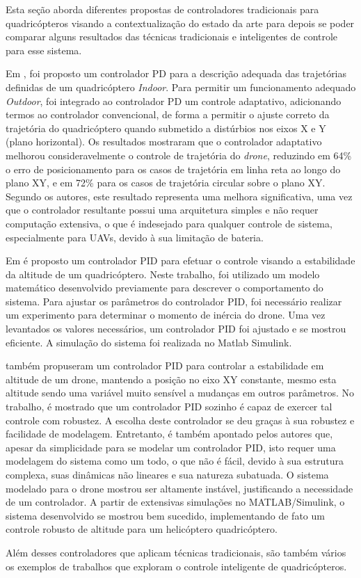 Esta seção aborda diferentes propostas de controladores tradicionais para quadricópteros visando a contextualização do estado da arte para depois se poder comparar alguns resultados das técnicas tradicionais e inteligentes de controle para esse sistema.

Em \cite{Razinkova2014}, foi proposto um controlador PD para a descrição adequada das trajetórias definidas de um quadricóptero \textit{Indoor}. Para permitir um funcionamento adequado \textit{Outdoor}, foi integrado ao controlador PD um controle adaptativo, adicionando termos ao controlador convencional, de forma a permitir o ajuste correto da trajetória do quadricóptero quando submetido a distúrbios nos eixos X e Y (plano horizontal). Os resultados mostraram que o controlador adaptativo melhorou consideravelmente o controle de trajetória do \textit{drone}, reduzindo em 64\% o erro de posicionamento para os casos de trajetória em linha reta ao longo do plano XY, e em 72\% para os casos de trajetória circular sobre o plano XY. Segundo os autores, este resultado representa uma melhora significativa, uma vez que o controlador resultante possui uma arquitetura simples e não requer computação extensiva, o que é indesejado para qualquer controle de sistema, especialmente para UAVs, devido à sua limitação de bateria.

Em \cite{Mustapa2014} é proposto um controlador PID para efetuar o controle visando a estabilidade da altitude de um quadricóptero. Neste trabalho, foi utilizado um modelo matemático desenvolvido previamente para descrever o comportamento do sistema. Para ajustar os parâmetros do controlador PID, foi necessário realizar um experimento para determinar o momento de inércia do drone. Uma vez levantados os valores necessários, um controlador PID foi ajustado e se mostrou eficiente. A simulação do sistema foi realizada no Matlab Simulink\textsuperscript{\textregistered}.

 também propuseram um controlador PID para controlar a estabilidade em altitude de um drone, mantendo a posição no eixo XY constante, mesmo esta altitude sendo uma variável muito sensível a mudanças em outros parâmetros. No trabalho, é mostrado que um controlador PID sozinho é capaz de exercer tal controle com robustez. A escolha deste controlador se deu graças à sua robustez e facilidade de modelagem. Entretanto, é também apontado pelos autores que, apesar da simplicidade para se modelar um controlador PID, isto requer uma modelagem do sistema como um todo, o que não é fácil, devido à sua estrutura complexa, suas dinâmicas não lineares e sua natureza subatuada. O sistema modelado para o drone mostrou ser altamente instável, justificando a necessidade de um controlador. A partir de extensivas simulações no MATLAB/Simulink, o sistema desenvolvido se mostrou bem sucedido, implementando de fato um controle robusto de altitude para um helicóptero quadricóptero.

Além desses controladores que aplicam técnicas tradicionais, são também vários os exemplos de trabalhos que exploram o controle inteligente de quadricópteros.
